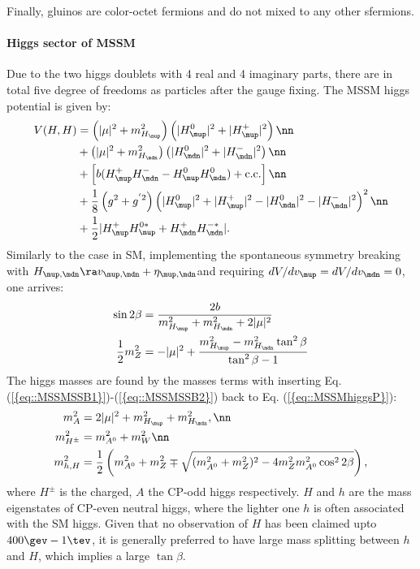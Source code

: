 Finally, gluinos are color-octet fermions and do not mixed to any other sfermions. \\



\paragraph{Higgs sector of MSSM}
Due to the two higgs doublets with 4 real and 4 imaginary parts, 
there are in total five degree of freedoms as particles after the gauge fixing.
The MSSM higgs potential is given by:
\begin{align}
V(H,H) 
& = \left( |\mu|^2 + m^2_{H_\mup} \right)  \left( |H^0_\mup|^2+|H^+_\mup|^2 \right) \nn \\
& + \left( |\mu|^2 + m^2_{H_\mdn} \right)  \left( |H^0_\mdn|^2+|H^-_\mdn|^2 \right) \nn \\
& + \left[ b (H^+_\mup H^-_\mdn-H^0_\mup H^0_\mdn) + \mathrm{c.c.} \right] \nn \\
& + \frac{1}{8} \left(g^2+g^{'2} \right) \left(   |H^0_\mup|^2+|H^+_\mup|^2-|H^0_\mdn|^2-|H^-_\mdn|^2   \right) ^2  \nn \\
& + \frac{1}{2} |H^+_\mup H^{0*}_\mup + H^+_\mdn H^{-*}_\mdn|. 
\label{eq::MSSMhiggsP}
\end{align}
Similarly to the case in SM, implementing the spontaneous symmetry breaking with $H_{\mup,\mdn} \ra v_{\mup,\mdn} + \eta_{\mup,\mdn}$and requiring $dV/dv_\mup = dV/dv_\mdn = 0$, one arrives:
\begin{align}
\sin{2\beta} & = \dfrac{2b}{m^2_{H_\mup} + m^2_{H_\mdn} + 2|\mu|^2 } \label{eq::MSSMSSB1} \\ 
\frac{1}{2} m_Z^2 & = -|\mu|^2 + \dfrac{m^2_{H_\mup}-m^2_{H_\mdn}\tan^2{\beta}}{\tan^2{\beta}-1} \label{eq::MSSMSSB2}
\end{align}
The higgs masses are found by the masses terms with inserting Eq. (\ref{{eq::MSSMSSB1}})-(\ref{{eq::MSSMSSB2}}) back to Eq. (\ref{{eq::MSSMhiggsP}}):
\begin{align}
m^2_{A} & = 2 |\mu|^2 + m^2_{H_\mup} + m^2_{H_\mdn}, \nn \\
m^2_{H^{\pm}} & = m^2_{A^0} + m^2_W \nn \\
m^2_{h,H} & = \dfrac{1}{2} \left( m^2_{A^0} + m_Z^2 \mp \sqrt{(m^2_{A^0} + m^2_Z)^2-4m_Z^2 m^2_{A^0}\cos^2{2\beta}}   \right),
\label{eq::MSSMhiggsMass}
\end{align}
where $H^{\pm}$ is the charged, $A$ the CP-odd higgs respectively. 
$H$ and $h$ are the mass eigenstates of CP-even neutral higgs, where the lighter one $h$ is often associated with the SM higgs. Given that no observation of $H$ has been claimed upto $400\gev-1\tev$, it is generally preferred to have large mass splitting between $h$ and $H$, which implies a large $\tan{\beta}$. \\





